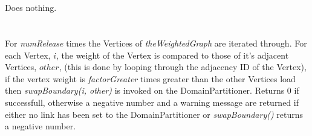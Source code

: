  \\
  \\ 
Does nothing. \\

 \\
 \\ 
For {\em numRelease} times the Vertices of {\em theWeightedGraph} are
iterated through. For each Vertex, $i$, the weight of the Vertex is compared
to those of it's adjacent Vertices, $other$, (this is done by looping through
the adjacency ID of the Vertex), if the vertex weight is {\em
factorGreater} times greater than the other Vertices load then {\em
swapBoundary(i, other)} is invoked on the DomainPartitioner. Returns
$0$ if successfull, otherwise a negative number and a warning message
are returned if either no link has been set to the DomainPartitioner
or {\em swapBoundary()} returns a negative number. \\



